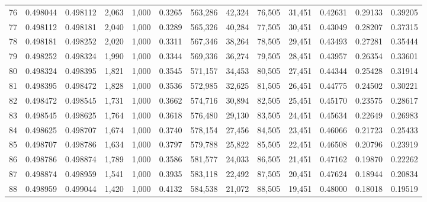 \begin{tabular}{rrrrrrrrrrrrr}
76  &  0.498044 &  0.498112 &   2,063 &  1,000 &                                     0.3265 &  563,286 &   42,324 &   76,505 &   31,451 &  0.42631 &  0.29133 &  0.39205 \\
77  &  0.498112 &  0.498181 &   2,040 &  1,000 &                                     0.3289 &  565,326 &   40,284 &   77,505 &   30,451 &  0.43049 &  0.28207 &  0.37315 \\
78  &  0.498181 &  0.498252 &   2,020 &  1,000 &                                     0.3311 &  567,346 &   38,264 &   78,505 &   29,451 &  0.43493 &  0.27281 &  0.35444 \\
79  &  0.498252 &  0.498324 &   1,990 &  1,000 &                                     0.3344 &  569,336 &   36,274 &   79,505 &   28,451 &  0.43957 &  0.26354 &  0.33601 \\
80  &  0.498324 &  0.498395 &   1,821 &  1,000 &                                     0.3545 &  571,157 &   34,453 &   80,505 &   27,451 &  0.44344 &  0.25428 &  0.31914 \\
81  &  0.498395 &  0.498472 &   1,828 &  1,000 &                                     0.3536 &  572,985 &   32,625 &   81,505 &   26,451 &  0.44775 &  0.24502 &  0.30221 \\
82  &  0.498472 &  0.498545 &   1,731 &  1,000 &                                     0.3662 &  574,716 &   30,894 &   82,505 &   25,451 &  0.45170 &  0.23575 &  0.28617 \\
83  &  0.498545 &  0.498625 &   1,764 &  1,000 &                                     0.3618 &  576,480 &   29,130 &   83,505 &   24,451 &  0.45634 &  0.22649 &  0.26983 \\
84  &  0.498625 &  0.498707 &   1,674 &  1,000 &                                     0.3740 &  578,154 &   27,456 &   84,505 &   23,451 &  0.46066 &  0.21723 &  0.25433 \\
85  &  0.498707 &  0.498786 &   1,634 &  1,000 &                                     0.3797 &  579,788 &   25,822 &   85,505 &   22,451 &  0.46508 &  0.20796 &  0.23919 \\
86  &  0.498786 &  0.498874 &   1,789 &  1,000 &                                     0.3586 &  581,577 &   24,033 &   86,505 &   21,451 &  0.47162 &  0.19870 &  0.22262 \\
87  &  0.498874 &  0.498959 &   1,541 &  1,000 &                                     0.3935 &  583,118 &   22,492 &   87,505 &   20,451 &  0.47624 &  0.18944 &  0.20834 \\
88  &  0.498959 &  0.499044 &   1,420 &  1,000 &                                     0.4132 &  584,538 &   21,072 &   88,505 &   19,451 &  0.48000 &  0.18018 &  0.19519 \\

\end{tabular}
